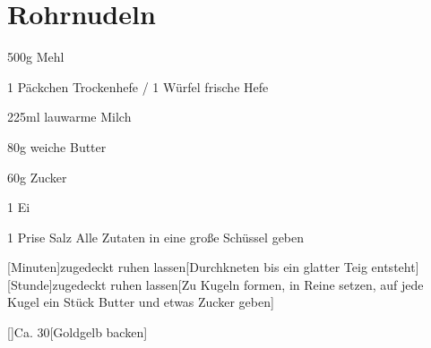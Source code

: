 \documentclass[a4,12pt,footinclude=true,oneside,headinclude=true]{scrartcl} %
\begin{document}

\pagebreak


\section{Rohrnudeln}
	\begin{ingredients} 
		\item 500g Mehl
		\item 1 Päckchen Trockenhefe / 1 Würfel frische Hefe
		\item 225ml lauwarme Milch
		\item 80g weiche Butter
		\item 60g Zucker
		\item 1 Ei
		\item 1 Prise Salz
			\subitem Alle Zutaten in eine große Schüssel geben
	\end{ingredients}

	[Minuten]{zugedeckt ruhen lassen}[Durchkneten bis ein glatter Teig entsteht]
	[Stunde]{zugedeckt ruhen lassen}[Zu Kugeln formen, in Reine setzen, auf jede Kugel ein Stück Butter und etwas Zucker geben]
		
	[]{Ca. 30}[Goldgelb backen]
	\pagebreak 
\end{document}
